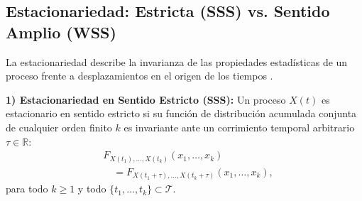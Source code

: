\documentclass[conference]{IEEEtran}
\begin{document}
\begin{table}[htbp]
\caption{Clasificación bidimensional de procesos estocásticos en telecomunicaciones.}
\label{tab:clasificacion}
\centering
{}
\end{table}

\subsection{Estacionariedad: Estricta (SSS) vs. Sentido Amplio (WSS)}
La estacionariedad describe la invarianza de las propiedades estadísticas de un proceso frente a desplazamientos en el origen de los tiempos \cite{walpole2012, leon2008}.

\textbf{1) Estacionariedad en Sentido Estricto (SSS):} Un proceso $X(t)$ es estacionario en sentido estricto si su función de distribución acumulada conjunta de cualquier orden finito $k$ es invariante ante un corrimiento temporal arbitrario $\tau \in \mathbb{R}$:
\begin{align}
&F_{X(t_1),\dots,X(t_k)}(x_1,\dots,x_k) \nonumber \\
&\quad = F_{X(t_1+\tau),\dots,X(t_k+\tau)}(x_1,\dots,x_k),
\label{eq:sss}
\end{align}
para todo $k \ge 1$ y todo $\{t_1, \dots, t_k\} \subset \mathcal{T}$.
\end{document}
